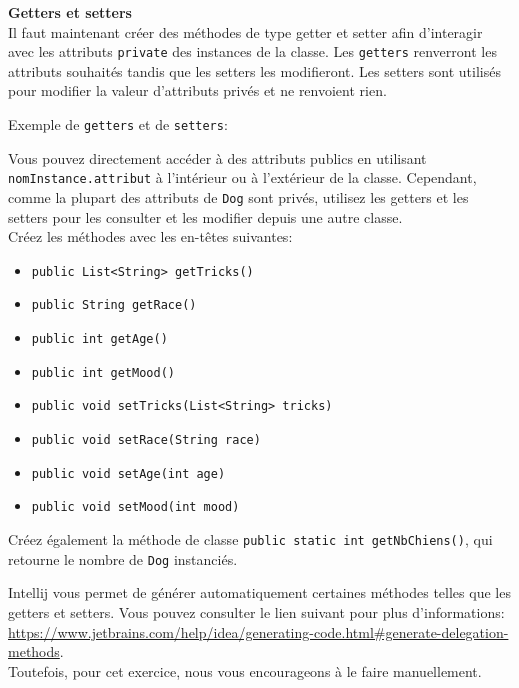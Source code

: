 \begin{Exercice}[10 minutes] \textbf{Getters et setters}\\
    Il faut maintenant créer des méthodes de type getter et setter afin d'interagir avec les attributs \lstinline{private} des instances de la classe. 
    Les \lstinline{getters} renverront les attributs souhaités tandis que les setters les modifieront.
    Les setters sont utilisés pour modifier la valeur d'attributs privés et ne renvoient rien.
    \begin{conseil}
        Exemple de \lstinline{getters} et de \lstinline{setters}:
        
    \end{conseil} 

    Vous pouvez directement accéder à des attributs publics en utilisant \lstinline{nomInstance.attribut} à l'intérieur ou à l'extérieur de la classe. 
    Cependant, comme la plupart des attributs de \lstinline{Dog} sont privés, utilisez les getters et les setters pour les consulter et les modifier depuis une autre classe. \\
    
    Créez les méthodes avec les en-têtes suivantes:
    \begin{itemize}
    \item \lstinline{public List<String> getTricks()}
    \item \lstinline{public String getRace()}
    \item \lstinline{public int getAge()}
    \item \lstinline{public int getMood()}
    \item \lstinline{public void setTricks(List<String> tricks)}
    \item \lstinline{public void setRace(String race)}
    \item \lstinline{public void setAge(int age)}
    \item \lstinline{public void setMood(int mood)}
    \end{itemize}
    
    Créez également la méthode de classe \lstinline{public static int getNbChiens()}, qui retourne le nombre de \lstinline{Dog} instanciés.
   	
\begin{conseil}
    Intellij vous permet de générer automatiquement certaines méthodes telles que les getters et setters. Vous pouvez consulter le lien suivant pour plus d'informations: \url{https://www.jetbrains.com/help/idea/generating-code.html\#generate-delegation-methods}.
    \\
    Toutefois, pour cet exercice, nous vous encourageons à le faire manuellement.
\end{conseil}
    
\begin{solution}
	
\end{solution}
\end{Exercice}


